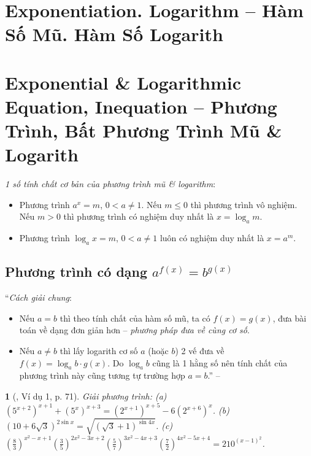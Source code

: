 \documentclass{article}
\newtheorem{baitoan}{}
\begin{document}
\section{Exponentiation. Logarithm -- Hàm Số Mũ. Hàm Số Logarith}


\section{Exponential \& Logarithmic Equation, Inequation -- Phương Trình, Bất Phương Trình Mũ \& Logarith}

\textit{1 số tính chất cơ bản của phương trình mũ \& logarithm}:
\begin{itemize}
	\item Phương trình $a^x = m$, $0 < a\ne 1$. Nếu $m\le 0$ thì phương trình vô nghiệm. Nếu $m > 0$ thì phương trình có nghiệm duy nhất là $x = \log_am$.
	\item Phương trình $\log_ax = m$, $0 < a\ne 1$ luôn có nghiệm duy nhất là $x = a^m$.
\end{itemize}

\subsection{Phương trình có dạng $a^{f(x)} = b^{g(x)}$}
``\textit{Cách giải chung}:
\begin{itemize}
	\item Nếu $a = b$ thì theo tính chất của hàm số mũ, ta có $f(x) = g(x)$, đưa bài toán về dạng đơn giản hơn -- \textit{phương pháp đưa về cùng cơ số}.
	\item Nếu $a\ne b$ thì lấy logarith cơ số $a$ (hoặc $b$) 2 vế đưa về $f(x) = \log_ab\cdot g(x)$. Do $\log_ab$ cũng là 1 hằng số nên tính chất của phương trình này cũng tương tự trường hợp $a = b$.'' -- \cite[p. 71]{TLCT_giai_tich_12}
\end{itemize}

\begin{baitoan}[\cite{TLCT_giai_tich_12}, Ví dụ 1, p. 71]
	Giải phương trình: (a) $(5^{x+2})^{x+1} + (5^x)^{x+3} = (2^{x+1})^{x+5} - 6(2^{x+6})^x$. (b) $(10 + 6\sqrt{3})^{2\sin x} = \sqrt{(\sqrt{3} + 1)^{\sin 4x}}$. (c) $\left(\frac{8}{3}\right)^{x^2 - x + 1}\left(\frac{3}{5}\right)^{2x^2 - 3x + 2}\left(\frac{5}{7}\right)^{3x^2 - 4x + 3}\left(\frac{7}{2}\right)^{4x^2 - 5x + 4} = 210^{(x - 1)^2}$.
\end{baitoan}
\end{document}
